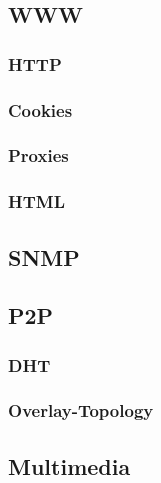 \documentclass[a4paper,10pt]{scrartcl}
\begin{document}
\subsection{WWW}
\subsubsection{HTTP}
\subsubsection{Cookies}
\subsubsection{Proxies}
\subsubsection{HTML}
\subsection{SNMP}
\subsection{P2P}
\subsubsection{DHT}
\subsubsection{Overlay-Topology}
\subsection{Multimedia}
\end{document}
